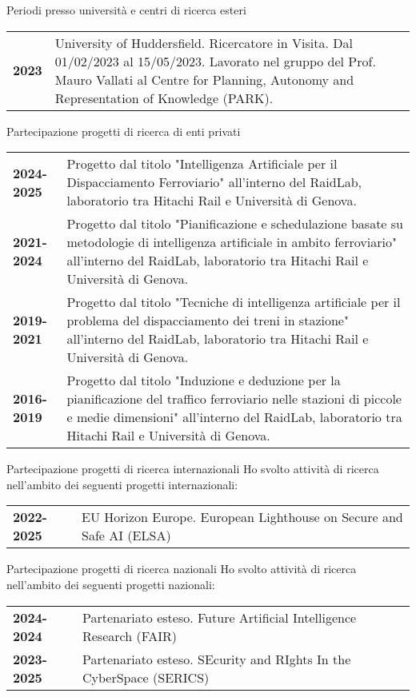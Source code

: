 \documentclass{resume} %
\begin{document}
\begin{rSection}{Periodi presso università e centri di ricerca esteri}
	\begin{tabularx}{0.95\textwidth} {lp{14cm}}
 \textbf{2023} & University of Huddersfield. Ricercatore in Visita. Dal 01/02/2023 al 15/05/2023. Lavorato nel gruppo del Prof. Mauro Vallati al Centre for Planning, Autonomy and Representation of Knowledge (PARK).
 \end{tabularx}
\end{rSection}

\begin{rSection}{Partecipazione progetti di ricerca di enti privati}
	\begin{tabularx}{0.95\textwidth} {lp{14cm}}
 	\textbf{2024-2025} & Progetto dal titolo "Intelligenza Artificiale per il Dispacciamento Ferroviario" all'interno del RaidLab, laboratorio tra Hitachi Rail e Università di Genova. \\
  	\textbf{2021-2024} & Progetto dal titolo "Pianificazione e schedulazione basate su metodologie di intelligenza artificiale in ambito ferroviario" all'interno del RaidLab, laboratorio tra Hitachi Rail e Università di Genova. \\
   	\textbf{2019-2021} & Progetto dal titolo "Tecniche di intelligenza artificiale per il problema del dispacciamento dei treni in stazione" all'interno del RaidLab, laboratorio tra Hitachi Rail e Università di Genova.\\
    \textbf{2016-2019} & Progetto dal titolo "Induzione e deduzione per la pianificazione del traffico ferroviario nelle stazioni di piccole e medie dimensioni" all'interno del RaidLab, laboratorio tra Hitachi Rail e Università di Genova.\\
 \end{tabularx}
\end{rSection}

\begin{rSection}{Partecipazione progetti di ricerca internazionali}
Ho svolto attività di ricerca nell'ambito dei seguenti progetti internazionali:\\
	\begin{tabularx}{0.95\textwidth} {lp{14cm}}
 \textbf{2022-2025} & EU Horizon Europe. European Lighthouse on Secure and Safe AI (ELSA)
 \end{tabularx}
\end{rSection}

\begin{rSection}{Partecipazione progetti di ricerca nazionali}
Ho svolto attività di ricerca nell'ambito dei seguenti progetti nazionali:\\
	\begin{tabularx}{0.95\textwidth} {lp{14cm}}
  \textbf{2024-2024} & Partenariato esteso. Future Artificial Intelligence Research (FAIR)\\
 \textbf{2023-2025} & Partenariato esteso. SEcurity and RIghts In the CyberSpace (SERICS)\\
 \end{tabularx}
\end{rSection}
\end{document}
